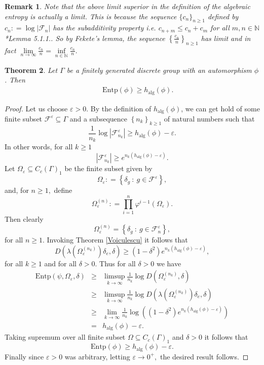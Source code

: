 \documentclass[a4paper,11pt,reqno]{amsart}
\theoremstyle{plain}
\newtheorem{thm}{Theorem}[section]
\newtheorem{rem}[thm]{Remark}
\theoremstyle{mainthmstyle}
\theoremstyle{named}
\numberwithin{equation}{section}
\newcommand{\Bea}{\begin{eqnarray*}}
\newcommand{\Eea}{\end{eqnarray*}}
\begin{document}
\begin{rem}
Note that the above limit superior in the definition of the algebraic entropy is actually a limit. This is because the sequence $\{c_n \}_{n \geq 1}$ defined by $c_n : = \log \left \lvert \mathcal F_n \right \rvert$ has the subadditivity property i.e. $c_{n + m} \leq c_n + c_m$ for all $m, n \in \mathbb N$ \cite{Dikranjan2013TopologicalEA}*{Lemma 5.1.1.}. So by Fekete's lemma, the sequence $\left \{\frac {c_n} {n} \right \}_{n \geq 1}$ has limit and in fact $\lim\limits_{n \to \infty} \frac {c_n} {n} = \inf\limits_{n \in \mathbb N} \frac {c_n} {n}.$
\end{rem}
\begin{thm}\label{lowerbound}
Let $\Gamma$ be a finitely generated discrete group with an automorphism $\phi$. Then
\begin{align*}
&& \mathrm{Entp}(\phi)\geq h_{\mathrm{alg}}(\phi).
\end{align*}
\end{thm}
\begin{proof}
Let us choose $\varepsilon > 0.$ By the definition of $h_{\mathrm{alg}}(\phi)$, we can get hold of some finite subset $\mathcal{F}^{\varepsilon} \subseteq \Gamma$ and a subsequence $\left \{n_k \right \}_{k \geq 1}$ of natural numbers such that $$\frac {1} {n_k} \log \left \lvert \mathcal{F}^{\varepsilon}_{n_k} \right \rvert \geq h_{\mathrm{alg}}(\phi) - \varepsilon.$$
In other words, for all $k \geq 1$
$$\left \lvert \mathcal{F}^{\varepsilon}_{n_k} \right \rvert \geq e^{n_k (h_{\mathrm{alg}}(\phi) - \varepsilon)}.$$
Let $\Omega_{\varepsilon} \subseteq C_c (\Gamma)_1$ be the finite subset given by $$\Omega_{\varepsilon} : = \left \{\delta_{g}\ :\ g \in \mathcal{F}^{\varepsilon} \right \},$$ and, for $n \geq 1,$ define $$\Omega_{\varepsilon}^{(n)} : = \prod\limits_{i = 1}^{n} \varphi^{i - 1} \left (\Omega_{\varepsilon} \right ).$$ Then clearly $$\Omega_{\varepsilon}^{(n)} = \left \{\delta_{g}\ :\ g \in \mathcal{F}^{\varepsilon}_{n} \right \},$$ for all $n \geq 1.$ Invoking Theorem \ref{Voiculescu} it follows that  $$D \left (\lambda \left (\Omega_{\varepsilon}^{(n_k)} \right ) \delta_e, \delta \right ) \geq \left (1 - \delta^{2} \right ) e^{n_k (h_{\mathrm{alg}}(\phi) - \varepsilon)},$$ for all $k \geq 1$ and for all $\delta > 0.$ Thus for all $\delta > 0$ we have 
\Bea
\mathrm {Entp} \left (\psi, \Omega_{\varepsilon}, \delta \right ) & \geq & \limsup\limits_{k \to \infty} \frac {1} {n_k} \log D \left (\Omega_{\varepsilon}^{(n_k)}, \delta \right ) \\ & \geq & \limsup\limits_{k \to \infty} \frac {1} {n_k} \log D \left (\lambda \left (\Omega_{\varepsilon}^{(n_k)} \right ) \delta_e, \delta \right ) \\ & \geq & \lim\limits_{k \to \infty} \frac {1} {n_k} \log \left (\left (1 - \delta^{2} \right ) e^{n_k (h_{\mathrm{alg}}(\phi) - \varepsilon)} \right ) \\ & = & h_{\mathrm{alg}}(\phi) - \varepsilon.
\Eea
Taking supremum over all finite subset $\Omega \subseteq C_c (\Gamma)_1$ and $\delta > 0$ it follows that $$\mathrm {Entp} (\phi) \geq h_{\mathrm{alg}}(\phi) - \varepsilon.$$ Finally since $\varepsilon > 0$ was arbitrary, letting $\varepsilon \to 0^{+},$ the desired result follows.
\end{proof}
\end{document}

